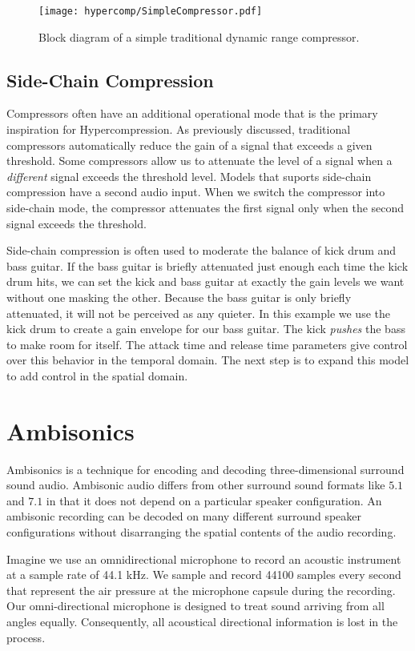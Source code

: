 \begin{figure*}
  \texttt{[image: hypercomp/SimpleCompressor.pdf]}
  \caption{Block diagram of a simple traditional dynamic range
    compressor.}
  \label{fig:comp-block}
\end{figure*}

\subsection{Side-Chain Compression}
\label{sec:side-chain-compr}
Compressors often have an additional operational mode that is the
primary inspiration for Hypercompression. As previously discussed,
traditional compressors automatically reduce the gain of a signal that
exceeds a given threshold. Some compressors allow us to attenuate the
level of a signal when a \emph{different} signal exceeds the threshold
level. Models that suports side-chain compression have a second audio
input. When we switch the compressor into side-chain mode, the
compressor attenuates the first signal only when the second signal
exceeds the threshold.

Side-chain compression is often used to moderate the balance of kick
drum and bass guitar. If the bass guitar is briefly attenuated just
enough each time the kick drum hits, we can set the kick and bass
guitar at exactly the gain levels we want without one masking the
other. Because the bass guitar is only briefly attenuated, it will not
be perceived as any quieter. In this example we use the kick drum to
create a gain envelope for our bass guitar. The kick \emph{pushes} the
bass to make room for itself. The attack time and release time
parameters give control over this behavior in the temporal domain. The
next step is to expand this model to add control in the spatial
domain.

\section{Ambisonics}
\label{sec:ambisonics}
Ambisonics is a technique for encoding and decoding three-dimensional
surround sound audio.\cite[-15mm]{Gerzon1973,Gerzon1985} Ambisonic
audio differs from other surround sound formats like $5.1$ and $7.1$
in that it does not depend on a particular speaker configuration. An
ambisonic recording can be decoded on many different surround speaker
configurations without disarranging the spatial contents of the audio
recording.

Imagine we use an omnidirectional microphone to record an acoustic
instrument at a sample rate of 44.1 kHz. We sample and record 44100
samples every second that represent the air pressure at the microphone
capsule during the recording. Our omni-directional microphone is
designed to treat sound arriving from all angles
equally. Consequently, all acoustical directional information is lost
in the process.

